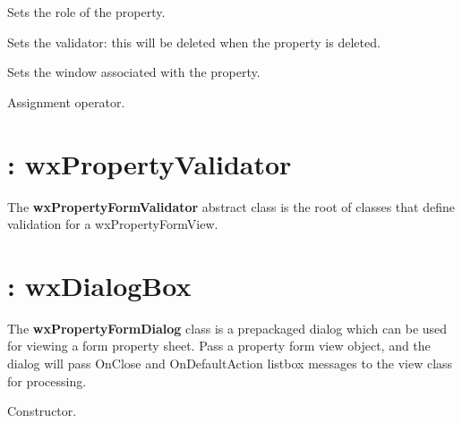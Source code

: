 

Sets the role  of the property.



Sets the validator: this will be deleted when the property is deleted.



Sets the window associated with the property.



Assignment operator.

\section{: wxPropertyValidator}\label{wxpropertyformvalidator}

The {\bf wxPropertyFormValidator} abstract class is the root of classes that define validation
for a wxPropertyFormView.


\section{: wxDialogBox}\label{wxpropertyformdialog}

The {\bf wxPropertyFormDialog} class is a prepackaged dialog which can
be used for viewing a form property sheet. Pass a property form view object, and the dialog
will pass OnClose and OnDefaultAction listbox messages to the view class for
processing.



Constructor.


